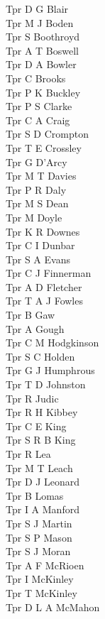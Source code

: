\begin{multicols}{3}
  Tpr D G Blair \\
  Tpr M J Boden \\
  Tpr S Boothroyd \\
  Tpr A T Boswell \\
  Tpr D A Bowler \\
  Tpr C Brooks \\
  Tpr P K Buckley \\
  Tpr P S Clarke \\
  Tpr C A Craig \\
  Tpr S D Crompton \\
  Tpr T E Crossley \\
  Tpr G D'Arcy \\
  Tpr M T Davies \\
  Tpr P R Daly \\
  Tpr M S Dean \\
  Tpr M Doyle \\
  Tpr K R Downes \\
  Tpr C I Dunbar \\
  Tpr S A Evans \\
  Tpr C J Finnerman \\
  Tpr A D Fletcher \\
  Tpr T A J Fowles \\
  Tpr B Gaw \\
  Tpr A Gough \\
  Tpr C M Hodgkinson \\
  Tpr S C Holden \\
  Tpr G J Humphrous \\
  Tpr T D Johnston \\
  Tpr R Judic \\
  Tpr R H Kibbey \\
  Tpr C E King \\
  Tpr S R B King \\
  Tpr R Lea \\
  Tpr M T Leach \\
  Tpr D J Leonard \\
  Tpr B Lomas \\
  Tpr I A Manford \\
  Tpr S J Martin \\
  Tpr S P Mason \\
  Tpr S J Moran \\
  Tpr A F McRioen \\
  Tpr I McKinley \\
  Tpr T McKinley \\
  Tpr D L A McMahon \\

\end{multicols}
